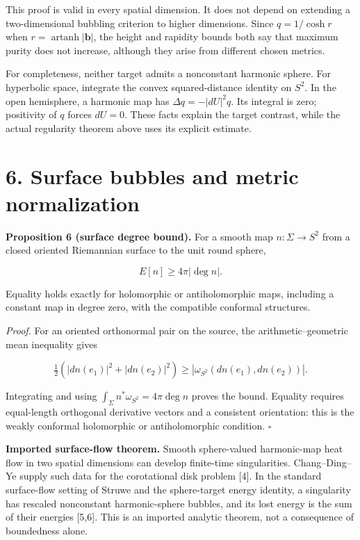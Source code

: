 \documentclass[
  11pt,
  a4paper,
]{article}
\begin{document}
This proof is valid in every spatial dimension. It does not depend on extending a two-dimensional bubbling criterion to higher dimensions. Since \(q=1/\cosh r\) when \(r=\operatorname{artanh}|\mathbf b|\), the height and rapidity bounds both say that maximum purity does not increase, although they arise from different chosen metrics.

For completeness, neither target admits a nonconstant harmonic sphere. For hyperbolic space, integrate the convex squared-distance identity on \(S^2\). In the open hemisphere, a harmonic map has \(\Delta q=-|dU|^2q\). Its integral is zero; positivity of \(q\) forces \(dU=0\). These facts explain the target contrast, while the actual regularity theorem above uses its explicit estimate.

\section{6. Surface bubbles and metric normalization}\label{surface-bubbles-and-metric-normalization}

\textbf{Proposition 6 (surface degree bound).} For a smooth map \(n:\Sigma\to S^2\) from a closed oriented Riemannian surface to the unit round sphere,

\[
E[n]\geq4\pi|\deg n|.
\]

Equality holds exactly for holomorphic or antiholomorphic maps, including a constant map in degree zero, with the compatible conformal structures.

\emph{Proof.} For an oriented orthonormal pair on the source, the arithmetic--geometric mean inequality gives

\[
\tfrac12(|dn(e_1)|^2+|dn(e_2)|^2)
\geq|\omega_{S^2}(dn(e_1),dn(e_2))|.
\]

Integrating and using \(\int_\Sigma n^*\omega_{S^2}=4\pi\deg n\) proves the bound. Equality requires equal-length orthogonal derivative vectors and a consistent orientation: this is the weakly conformal holomorphic or antiholomorphic condition. \(\square\)

\textbf{Imported surface-flow theorem.} Smooth sphere-valued harmonic-map heat flow in two spatial dimensions can develop finite-time singularities. Chang--Ding--Ye supply such data for the corotational disk problem {[}4{]}. In the standard surface-flow setting of Struwe and the sphere-target energy identity, a singularity has rescaled nonconstant harmonic-sphere bubbles, and its lost energy is the sum of their energies {[}5,6{]}. This is an imported analytic theorem, not a consequence of boundedness alone.
\end{document}
